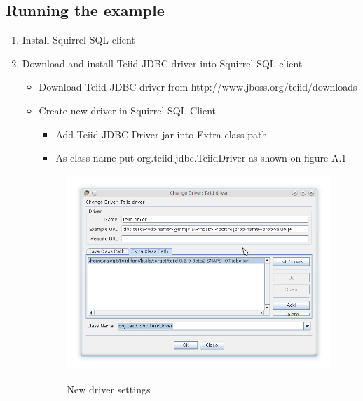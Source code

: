 \documentclass[oneside,12pt]{fithesis2}
\begin{document}
\begin{enumerate}
\subsection*{Running the example}
\begin{enumerate}
 \item Install Squirrel SQL client
 \item Download and install Teiid JDBC driver into Squirrel SQL client
 \begin{itemize}
  \item Download Teiid JDBC driver from http://www.jboss.org/teiid/downloads
  \item Create new driver in Squirrel SQL Client
  \begin{itemize}
   \item Add Teiid JDBC Driver jar into Extra class path
   \item As class name put org.teiid.jdbc.TeiidDriver as shown on figure A.1
  \end{itemize}
  \begin{figure}[h]
 \centering
 \includegraphics[scale=0.7]{driver}
 \label{driver}
 \caption{New driver settings}
\end{figure}
  

\end{itemize}
\end{enumerate}
\end{enumerate}
\end{document}
